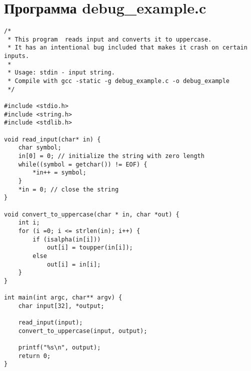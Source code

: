 \chapter{Программа debug_example.c}\label{chap:debug-example}

\begin{lstlisting}
/*
 * This program  reads input and converts it to uppercase.
 * It has an intentional bug included that makes it crash on certain inputs.
 * 
 * Usage: stdin - input string.
 * Compile with gcc -static -g debug_example.c -o debug_example
 */
	
#include <stdio.h>
#include <string.h>
#include <stdlib.h>

void read_input(char* in) {
    char symbol;
    in[0] = 0; // initialize the string with zero length
    while((symbol = getchar()) != EOF) {
        *in++ = symbol;
    }
    *in = 0; // close the string
}

void convert_to_uppercase(char * in, char *out) {
    int i;
    for (i =0; i <= strlen(in); i++) {
        if (isalpha(in[i]))
            out[i] = toupper(in[i]);
        else
            out[i] = in[i];
    }
}

int main(int argc, char** argv) {
    char input[32], *output;
    
    read_input(input);
    convert_to_uppercase(input, output);
    
    printf("%s\n", output);
    return 0;
}
\end{lstlisting}
